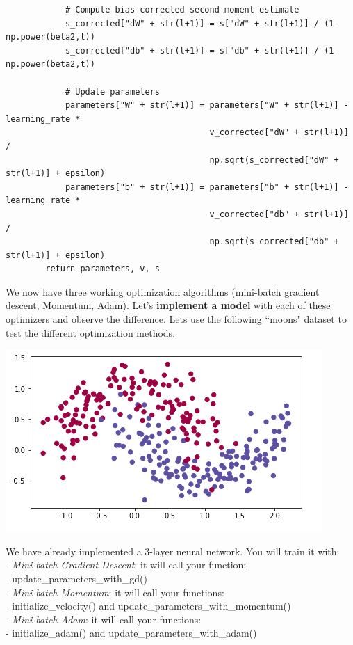 \documentclass[11pt, a4paper]{article}
\begin{document}
\begin{spacing}{1.1}
\begin{lstlisting}
			# Compute bias-corrected second moment estimate
			s_corrected["dW" + str(l+1)] = s["dW" + str(l+1)] / (1-np.power(beta2,t))
			s_corrected["db" + str(l+1)] = s["db" + str(l+1)] / (1-np.power(beta2,t))
			
			# Update parameters
			parameters["W" + str(l+1)] = parameters["W" + str(l+1)] - learning_rate * 
			                             v_corrected["dW" + str(l+1)] / 
			                             np.sqrt(s_corrected["dW" + str(l+1)] + epsilon)
			parameters["b" + str(l+1)] = parameters["b" + str(l+1)] - learning_rate * 
			                             v_corrected["db" + str(l+1)] / 
			                             np.sqrt(s_corrected["db" + str(l+1)] + epsilon)
		return parameters, v, s \end{lstlisting} \vspace*{1mm}
	We now have three working optimization algorithms (mini-batch gradient descent, Momentum, Adam). Let's \textbf{implement a model} with each of these optimizers and observe the difference. Lets use the following ``moons" dataset to test the different optimization methods.
	\begin{center} \includegraphics[scale=.55]{moon_data} \\ \end{center}
	We have already implemented a 3-layer neural network. You will train it with: \\
	\hspace*{3mm} - \textit{Mini-batch Gradient Descent}: it will call your function: \\
	\hspace*{7mm} - update\_parameters\_with\_gd() \\
	\hspace*{3mm} - \textit{Mini-batch Momentum}: it will call your functions: \\
	\hspace*{7mm} - initialize\_velocity() and update\_parameters\_with\_momentum() \\
	\hspace*{3mm} - \textit{Mini-batch Adam}: it will call your functions: \\
	\hspace*{7mm} - initialize\_adam() and update\_parameters\_with\_adam() \newpage


\end{spacing}
\end{document}

